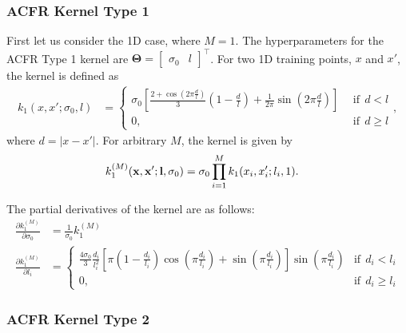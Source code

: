 \subsubsection{ACFR Kernel Type 1}
\label{subs:acfrkerneltype1}

First let us consider the 1D case, where $M = 1$.  The hyperparameters for the ACFR Type 1
kernel are ${\boldsymbol \Theta} = \begin{bmatrix}
    \sigma_0 & l
  \end{bmatrix}^\top $. For two 1D training points, $x$ and $x'$, the kernel is defined as
\begin{align*}
  k_1 (x, x'; \sigma_0, l) &= \left\{
    \begin{array}{cc}
      \sigma_0 \left[\frac{2+\cos(2\pi \frac{d}{l})}{3} \left(1 -
          \frac{d}{l}\right) + \frac{1}{2\pi} \sin \left(2\pi \frac{d}{l}\right)\right] \ \
      & \text{if}\ \ d < l \\
      0, & \text{if}\ \ d \ge l
    \end{array}
  \right.,
\end{align*}
where $d = |x - x'|$.  For arbitrary $M$, the kernel is given by
\begin{align*}
  k^{(M)}_1 ({\bf x}, {\bf x}'; {\bf l}, \sigma_0) &= \sigma_0 \prod\limits_{i=1}^{M} k_1
  (x_i, x_i'; l_i, 1).
\end{align*}

The partial derivatives of the kernel are as follows:
\begin{align*}
  \frac{\partial k_1^{(M)}}{\partial
    \sigma_0} &= \frac{1}{\sigma_0} k_1^{(M)} \\
  \frac{\partial k_1^{(M)}}{\partial
    l_i} &= \left\{
    \begin{array}{cc}
      \frac{4\sigma_0}{3} \frac{d_i}{l_i^2} \left[\pi \left(1 - \frac{d_i}{l_i}\right)
        \cos \left(\pi \frac{d_i}{l_i}\right) + \sin \left(\pi \frac{d_i}{l_i}\right)\right]
      \sin \left(\pi \frac{d_i}{l_i}\right) & \text{if}\ \ d_i < l_i \\
      0, & \text{if}\ \ d_i \ge l_i
    \end{array}
  \right.
\end{align*}

\subsubsection{ACFR Kernel Type 2}
\label{subs:acfrkerneltype2}

